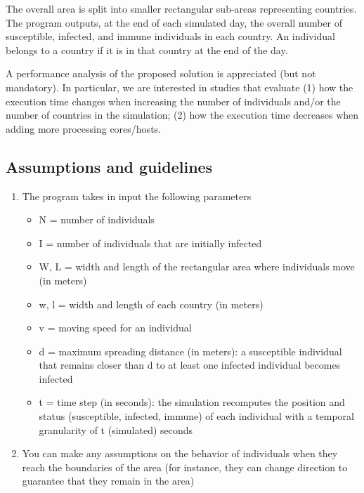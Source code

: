 \documentclass[table, 12pt]{article}
\begin{document}
The overall area is split into smaller rectangular sub-areas representing countries. The program outputs, at the
end of each simulated day, the overall number of susceptible, infected, and immune individuals in each country.
An individual belongs to a country if it is in that country at the end of the day.

A performance analysis of the proposed solution is appreciated (but not mandatory). In particular, we are
interested in studies that evaluate (1) how the execution time changes when increasing the number of
individuals and/or the number of countries in the simulation; (2) how the execution time decreases when
adding more processing cores/hosts.

\subsection{Assumptions and guidelines}
 \begin{enumerate}
 
 \item
 The program takes in input the following parameters

\begin{itemize}
\setlength\itemsep{-0.5em}

\item N = number of individuals
\item  I = number of individuals that are initially infected
\item  W, L = width and length of the rectangular area where individuals move (in meters)
\item  w, l = width and length of each country (in meters)
\item  v = moving speed for an individual
\item  d = maximum spreading distance (in meters): a susceptible individual that remains closer than d to at least one infected individual becomes infected
\item  t = time step (in seconds): the simulation recomputes the position and status (susceptible,
infected, immune) of each individual with a temporal granularity of t (simulated) seconds
\end{itemize} 
\item 
You can make any assumptions on the behavior of individuals when they reach the boundaries of the
area (for instance, they can change direction to guarantee that they remain in the area)
\end{enumerate}
\end{document}
